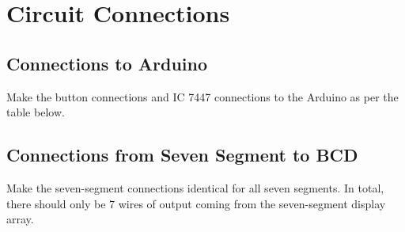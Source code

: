 \section{Circuit Connections}
\subsection{Connections to Arduino}
\raggedright
Make the button connections and IC 7447 connections to the Arduino as per the table below.\\
\vspace{0.25cm}


\subsection{Connections from Seven Segment to BCD}
\raggedright
Make the seven-segment connections identical for all seven segments. In total, there should only be 7 wires of output coming from the seven-segment display array.
\vspace{0.25cm}

